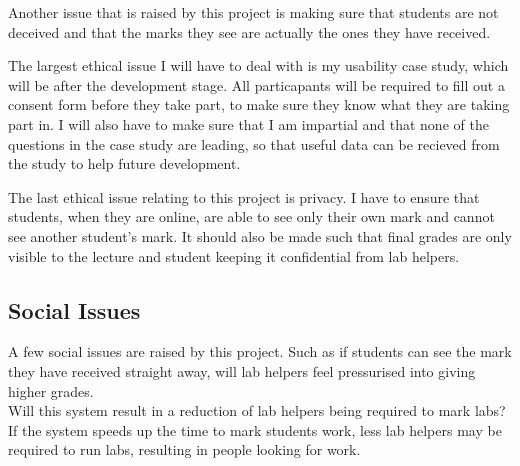 \documentclass[12pt]{article}  %
\begin{document}
Another issue that is raised by this project is making sure that students are not deceived and that the marks they see are actually the ones they have received.

The largest ethical issue I will have to deal with is my usability case study, which will be after the development stage. All particapants will be required to fill out a consent form before they take part, to make sure they know what they are taking part in. I will also have to make sure that I am impartial and that none of the questions in the case study are leading, so that useful data can be recieved from the study to help future development.

The last ethical issue relating to this project is privacy. I have to  ensure that students, when they are online, are able to see only their own mark and cannot see another student's mark. It should also be made such that final grades are only visible to the lecture and student keeping it confidential from lab helpers.



\subsection{Social Issues}
A few social issues are raised by this project. Such as if students can see the mark they have received straight away, will lab helpers feel pressurised into giving higher grades.\\
Will this system result in a reduction of lab helpers being required to mark labs? If the system speeds up the time to mark students work, less lab helpers may be required to run labs, resulting in people looking for work.







\newpage
\printbibliography[heading=bibintoc]
\let\cleardoublepage\clearpage



\end{document}
